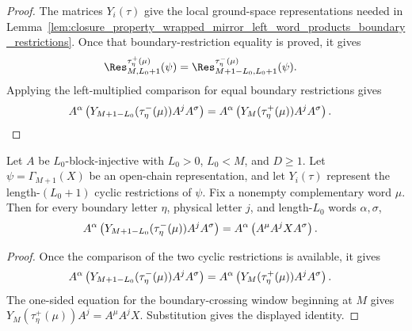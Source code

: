 \begin{proof}
    \leanok
    The matrices $Y_i(\tau)$ give the local ground-space representations needed
    in Lemma~\ref{lem:closure_property_wrapped_mirror_left_word_products_boundary_restrictions}. Once that boundary-restriction equality is
    proved, it gives
    \begin{align}
        \Res^{\tau^+_\eta(\mu)}_{M,L_0+1}(\psi)
         & =
        \Res^{\tau^-_\eta(\mu)}_{M+1-L_0,L_0+1}(\psi).
        \notag
    \end{align}
    Applying the left-multiplied comparison for equal boundary restrictions
    gives
    \begin{align}
        A^\alpha
        \left(Y_{M+1-L_0}(\tau^-_\eta(\mu))A^jA^\sigma\right)
         & =
        A^\alpha
        \left(Y_M(\tau^+_\eta(\mu))A^jA^\sigma\right).
        \notag
    \end{align}
\end{proof}

\begin{lemma}
    \label{thm:closure_property_mirror_left_word_products_ground_space}
    \leanok
    Let $A$ be $L_0$-block-injective with $L_0>0$, $L_0<M$, and
    $D\ge1$. Let $\psi=\Gamma_{M+1}(X)$ be an open-chain representation, and
    let $Y_i(\tau)$ represent the length-$(L_0+1)$ cyclic restrictions of
    $\psi$. Fix a nonempty complementary word $\mu$. Then for every boundary
    letter $\eta$, physical letter $j$, and length-$L_0$ words
    $\alpha,\sigma$,
    \begin{align}
        A^\alpha
        \left(Y_{M+1-L_0}(\tau^-_\eta(\mu))A^jA^\sigma\right)
         & =
        A^\alpha
        \left(A^\mu A^jXA^\sigma\right).
        \notag
    \end{align}
\end{lemma}

\begin{proof}
    \leanok
    Once the comparison of the two cyclic restrictions is available, it gives
    \begin{align}
        A^\alpha
        \left(Y_{M+1-L_0}(\tau^-_\eta(\mu))A^jA^\sigma\right)
         & =
        A^\alpha
        \left(Y_M(\tau^+_\eta(\mu))A^jA^\sigma\right).
        \notag
    \end{align}
    The one-sided equation for the boundary-crossing window beginning at $M$
    gives
    $Y_M(\tau^+_\eta(\mu))A^j = A^\mu A^jX$.
    Substitution gives the displayed identity.
\end{proof}

